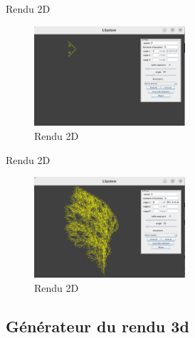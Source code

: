 \begin{frame}{Rendu 2D}
    \begin{figure}[h!]
      \centering
      \includegraphics[width=0.5\textwidth]{images/2DD.png}
      \caption{Rendu 2D}
      \label{fig:3D}
    \end{figure}
\end{frame}
\begin{frame}{Rendu 2D}

     \begin{figure}[h!]
      \centering
      \includegraphics[width=0.5\textwidth]{images/rendu2D.png}
      \caption{Rendu 2D}
      \label{fig:3D}
    \end{figure}

     
\end{frame}
\subsection{Générateur du rendu 3d}

